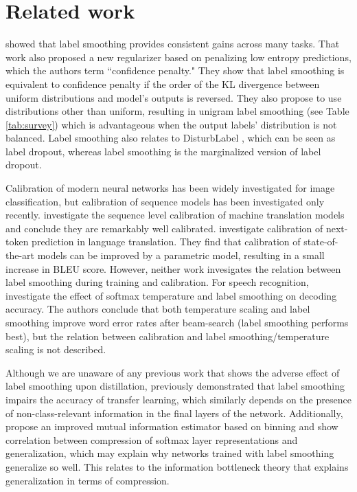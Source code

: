 \documentclass{article}
\begin{document}
\section{Related work}

\citet{pereyra2017regularizing} showed that label smoothing provides consistent gains across many tasks. That work also proposed a new regularizer based on penalizing low entropy predictions, which the authors term ``confidence penalty." They show that label smoothing is equivalent to confidence penalty if the order of the KL divergence between uniform distributions and model's outputs is reversed. They also propose to use distributions other than  uniform, resulting in unigram label smoothing (see Table \ref{tab:survey}) which is advantageous when the output labels' distribution is not balanced. Label smoothing also relates to DisturbLabel \citep{xie2016disturblabel}, which can be seen as label dropout, whereas label smoothing is the marginalized version of label dropout.

Calibration of modern neural networks \citep{guo2017calibration} has been widely investigated for image classification, but calibration of sequence models has been investigated only recently. \citet{ott2018analyzing} investigate the sequence level calibration of machine translation models and conclude they are remarkably well calibrated. \citet{kumar2019calibration} investigate calibration of next-token prediction in language translation. They find that calibration of state-of-the-art models can be improved by a parametric model, resulting in a small increase in BLEU score. However, neither work invesigates the relation between label smoothing during training and calibration. For speech recognition, \citet{temporal} investigate the effect of softmax temperature and label smoothing on decoding accuracy. The authors conclude that both temperature scaling and label smoothing improve word error rates after beam-search (label smoothing performs best), but the relation between calibration and label smoothing/temperature scaling is not described.

Although we are unaware of any previous work that shows the adverse effect of label smoothing upon distillation, \citet{kornblith2018better} previously demonstrated that label smoothing impairs the accuracy of transfer learning, which similarly depends on the presence of non-class-relevant information in the final layers of the network. Additionally, \citet{chelombiev2019adaptive} propose an improved mutual information estimator based on binning and show correlation between compression of softmax layer representations and generalization, which may explain why networks trained with label smoothing generalize so well. This relates to the information bottleneck theory \citep{shwartz2017opening,tishby2015deep,tishby2000information} that explains generalization in terms of compression. 
\end{document}
